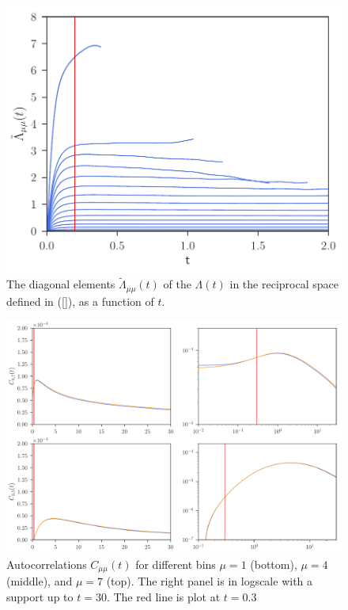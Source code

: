 \documentclass[a4paper,openright,12pt]{book}
\begin{document}
\begin{figure}[h!]
  \centering
\includegraphics[scale=0.45]{LambdatRec-WALLS-17nodes}
\caption[Diagonal elements  $\tilde{\Lambda}_{\mu\mu}(t)$ of $\Lambda(t)$ in the reciprocal space - 17nodes.]{The  diagonal elements  $\tilde{\Lambda}_{\mu\mu}(t)$ of  the
  $\Lambda(t)$ in the reciprocal space defined in (\ref{}), as a
  function of $t$.}
\label{fig:LambdatRec-WALLS-17nodes}
\end{figure}

\begin{figure}[h!]
  \centering
\includegraphics[scale=0.45]{Predictions-WALLS-17nodes}
\caption[Predicted autocorrelations of $C(t)$ for 17 nodes.] {Autocorrelations $C_{\mu\mu}(t)$  for different  bins $\mu=1$
  (bottom),  $\mu=4$  (middle),  and  $\mu=7$ (top).  The  right panel  is  in 
  logscale with a support up to $t=30$. The red line is plot at $t=0.3$}
\label{fig:Predictions-WALLS-17nodes}
\end{figure}
\end{document}
